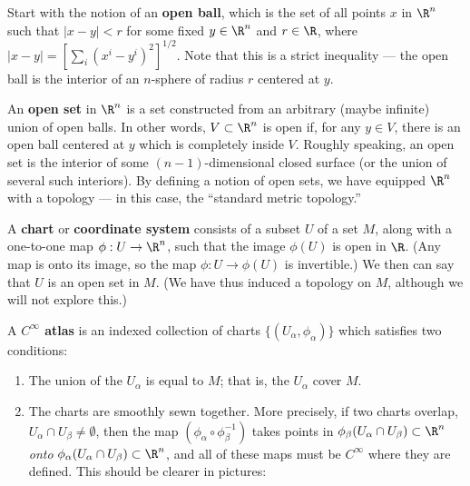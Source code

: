 Start with the notion of an {\bf open ball}, which is the set of all
points $x$ in $\R^n$ such that $|x-y|<r$ for some fixed $y\in \R^n$ and
$r\in \R$, where $|x-y|=[\sum_i(x^i-y^i)^2]^{1/2}$.  Note that this is
a strict inequality --- the open ball is the interior of an $n$-sphere
of radius $r$ centered at $y$.

\begin{figure}[h]
  \centerline{
  }
\end{figure}

\noindent An {\bf open set} in $\R^n$ is a set constructed from an arbitrary
(maybe infinite) union of open balls.  In other words, $V\subset \R^n$ is
open if, for any $y\in V$, there is an open ball centered at $y$ which
is completely inside $V$.  Roughly speaking, an open set is the interior
of some $(n-1)$-dimensional closed surface (or the union of several such
interiors).  By defining a notion of open sets, we have equipped $\R^n$
with a topology --- in this case, the ``standard metric topology.''

A {\bf chart} or {\bf coordinate system} consists of a subset $U$ of a 
set $M$, along with a one-to-one map $\phi:U\rightarrow\R^n$, such that the 
image $\phi(U)$ is open in $\R$.  (Any map is onto its image, so the
map $\phi:U\rightarrow \phi(U)$ is invertible.)  We then can say that
$U$ is an open set in $M$.  (We have thus induced a topology on $M$,
although we will not explore this.)

\begin{figure}[h]
  \centerline{
  }
\end{figure}

\noindent A {\bf $C^\infty$ atlas} is an indexed collection of charts 
$\{(U_\alpha,\phi_\alpha)\}$ which satisfies two conditions:
\begin{enumerate}
  \item The union of the $U_\alpha$ is equal to $M$; that is, the
   $U_\alpha$ cover $M$.
  \item The charts are smoothly sewn together.  More precisely, if
   two charts overlap, $U_\alpha\cap U_\beta\neq\emptyset$, then the
   map $(\phi_\alpha\circ\phi_\beta^{-1})$ takes points in 
   $\phi_\beta(U_\alpha\cap U_\beta)\subset\R^n$ {\it onto}
   $\phi_\alpha(U_\alpha\cap U_\beta)\subset\R^n$, and all of these
   maps must be $C^\infty$ where they are defined.  This should be clearer 
   in pictures:
\end{enumerate}

